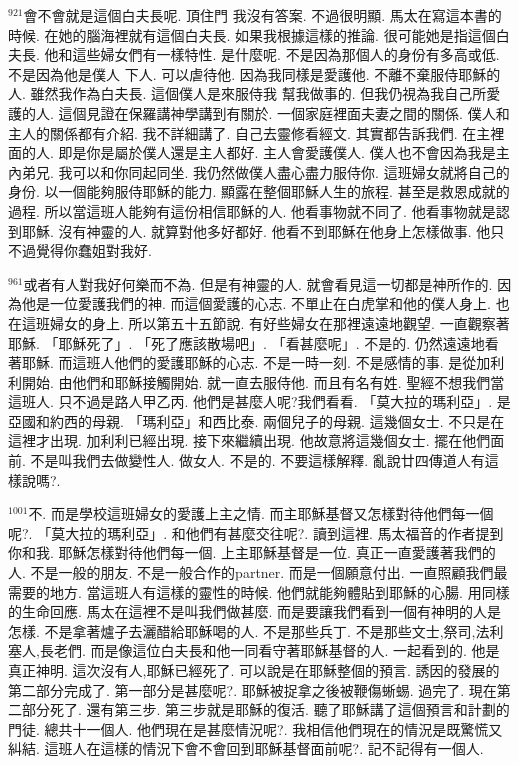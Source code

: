 \documentclass{book}
\begin{document}
$^{921}$會不會就是這個白夫長呢.
頂住門 我沒有答案.
不過很明顯.
馬太在寫這本書的時候.
在她的腦海裡就有這個白夫長.
如果我根據這樣的推論.
很可能她是指這個白夫長.
他和這些婦女們有一樣特性.
是什麼呢.
不是因為那個人的身份有多高或低.
不是因為他是僕人 下人.
可以虐待他.
因為我同樣是愛護他.
不離不棄服侍耶穌的人.
雖然我作為白夫長.
這個僕人是來服侍我 幫我做事的.
但我仍視為我自己所愛護的人.
這個見證在保羅講神學講到有關於.
一個家庭裡面夫妻之間的關係.
僕人和主人的關係都有介紹.
我不詳細講了.
自己去靈修看經文.
其實都告訴我們.
在主裡面的人.
即是你是屬於僕人還是主人都好.
主人會愛護僕人.
僕人也不會因為我是主內弟兄.
我可以和你同起同坐.
我仍然做僕人盡心盡力服侍你.
這班婦女就將自己的身份.
以一個能夠服侍耶穌的能力.
顯露在整個耶穌人生的旅程.
甚至是救恩成就的過程.
所以當這班人能夠有這份相信耶穌的人.
他看事物就不同了.
他看事物就是認到耶穌.
沒有神靈的人.
就算對他多好都好.
他看不到耶穌在他身上怎樣做事.
他只不過覺得你蠢姐對我好.

$^{961}$或者有人對我好何樂而不為.
但是有神靈的人.
就會看見這一切都是神所作的.
因為他是一位愛護我們的神.
而這個愛護的心志.
不單止在白虎掌和他的僕人身上.
也在這班婦女的身上.
所以第五十五節說.
有好些婦女在那裡遠遠地觀望.
一直觀察著耶穌.
「耶穌死了」.
「死了應該散場吧」.
「看甚麼呢」.
不是的.
仍然遠遠地看著耶穌.
而這班人他們的愛護耶穌的心志.
不是一時一刻.
不是感情的事.
是從加利利開始.
由他們和耶穌接觸開始.
就一直去服侍他.
而且有名有姓.
聖經不想我們當這班人.
只不過是路人甲乙丙.
他們是甚麼人呢?我們看看.
「莫大拉的瑪利亞」.
是亞國和約西的母親.
「瑪利亞」和西比泰.
兩個兒子的母親.
這幾個女士.
不只是在這裡才出現.
加利利已經出現.
接下來繼續出現.
他故意將這幾個女士.
擺在他們面前.
不是叫我們去做變性人.
做女人.
不是的.
不要這樣解釋.
亂說廿四傳道人有這樣說嗎?.

$^{1001}$不.
而是學校這班婦女的愛護上主之情.
而主耶穌基督又怎樣對待他們每一個呢?.
「莫大拉的瑪利亞」.
和他們有甚麼交往呢?.
讀到這裡.
馬太福音的作者提到你和我.
耶穌怎樣對待他們每一個.
上主耶穌基督是一位.
真正一直愛護著我們的人.
不是一般的朋友.
不是一般合作的partner.
而是一個願意付出.
一直照顧我們最需要的地方.
當這班人有這樣的靈性的時候.
他們就能夠體貼到耶穌的心腸.
用同樣的生命回應.
馬太在這裡不是叫我們做甚麼.
而是要讓我們看到一個有神明的人是怎樣.
不是拿著爐子去灑醋給耶穌喝的人.
不是那些兵丁.
不是那些文士,祭司,法利塞人,長老們.
而是像這位白夫長和他一同看守著耶穌基督的人.
一起看到的.
他是真正神明.
這次沒有人,耶穌已經死了.
可以說是在耶穌整個的預言.
誘因的發展的第二部分完成了.
第一部分是甚麼呢?.
耶穌被捉拿之後被鞭傷蜥蜴.
過完了.
現在第二部分死了.
還有第三步.
第三步就是耶穌的復活.
聽了耶穌講了這個預言和計劃的門徒.
總共十一個人.
他們現在是甚麼情況呢?.
我相信他們現在的情況是既驚慌又糾結.
這班人在這樣的情況下會不會回到耶穌基督面前呢?.
記不記得有一個人.
\end{document}
